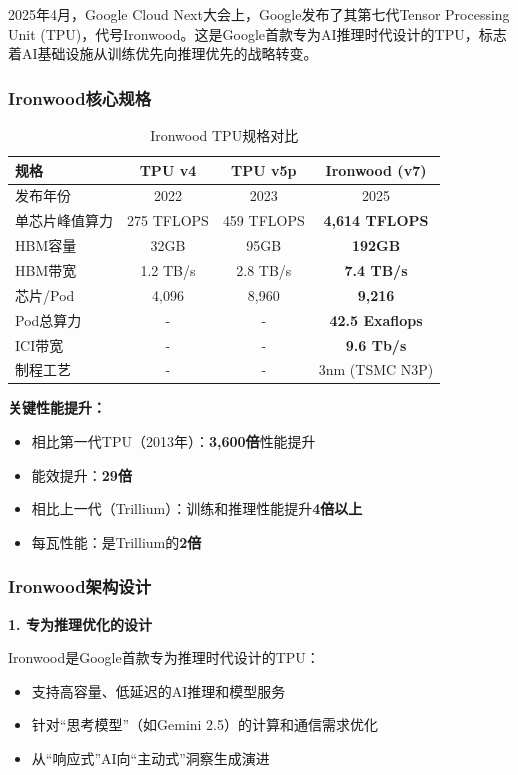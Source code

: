 2025年4月，Google Cloud Next大会上，Google发布了其第七代Tensor Processing Unit (TPU)，代号Ironwood。这是Google首款专为AI推理时代设计的TPU，标志着AI基础设施从训练优先向推理优先的战略转变。

\subsubsection{Ironwood核心规格}

\begin{table}[htbp]
\centering
\caption{Ironwood TPU规格对比}
\begin{tabular}{|l|c|c|c|}
\hline
\textbf{规格} & \textbf{TPU v4} & \textbf{TPU v5p} & \textbf{Ironwood (v7)} \\
\hline
发布年份 & 2022 & 2023 & 2025 \\
单芯片峰值算力 & 275 TFLOPS & 459 TFLOPS & \textbf{4,614 TFLOPS} \\
HBM容量 & 32GB & 95GB & \textbf{192GB} \\
HBM带宽 & 1.2 TB/s & 2.8 TB/s & \textbf{7.4 TB/s} \\
芯片/Pod & 4,096 & 8,960 & \textbf{9,216} \\
Pod总算力 & - & - & \textbf{42.5 Exaflops} \\
ICI带宽 & - & - & \textbf{9.6 Tb/s} \\
制程工艺 & - & - & 3nm (TSMC N3P) \\
\hline
\end{tabular}
\end{table}

\textbf{关键性能提升：}
\begin{itemize}
    \item 相比第一代TPU（2013年）：\textbf{3,600倍}性能提升
    \item 能效提升：\textbf{29倍}
    \item 相比上一代（Trillium）：训练和推理性能提升\textbf{4倍以上}
    \item 每瓦性能：是Trillium的\textbf{2倍}
\end{itemize}

\subsubsection{Ironwood架构设计}

\textbf{1. 专为推理优化的设计}

Ironwood是Google首款专为推理时代设计的TPU：
\begin{itemize}
    \item 支持高容量、低延迟的AI推理和模型服务
    \item 针对``思考模型''（如Gemini 2.5）的计算和通信需求优化
    \item 从``响应式''AI向``主动式''洞察生成演进
\end{itemize}

